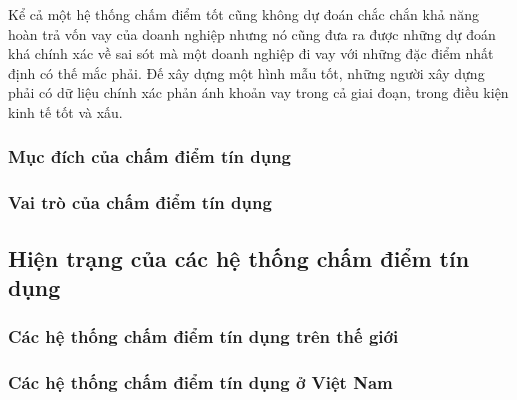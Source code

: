 Kể cả một hệ thống chấm điểm tốt cũng không dự đoán chắc chắn khả năng hoàn trả vốn vay của doanh nghiệp nhưng nó cũng đưa ra được những dự đoán khá chính xác về sai sót mà một doanh nghiệp đi vay với những đặc điểm nhất định có thế mắc phải. Đế xây dựng một hình mẫu tốt, những người xây dựng phải có dữ liệu chính xác phản ánh khoản vay trong cả giai đoạn, trong điều kiện kinh tế tốt và xấu.

\subsubsection{Mục đích của chấm điểm tín dụng}
\subsubsection{Vai trò của chấm điểm tín dụng}

\subsection{Hiện trạng của các hệ thống chấm điểm tín dụng}
\subsubsection{Các hệ thống chấm điểm tín dụng trên thế giới}
\subsubsection{Các hệ thống chấm điểm tín dụng ở Việt Nam}

